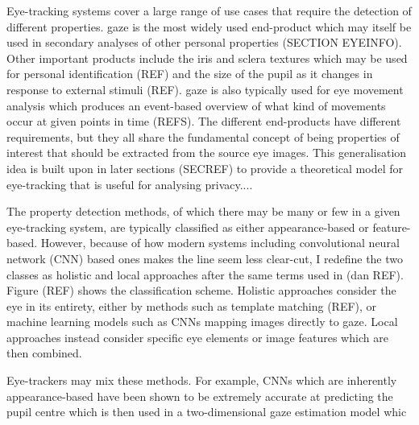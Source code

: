 Eye-tracking systems cover a large range of use cases that require the detection of different properties. \Gls{gaze} is the most widely used end-product which may itself be used in secondary analyses of other personal properties (SECTION EYEINFO). Other important products include the iris and sclera textures which may be used for personal identification (REF) and the size of the pupil as it changes in response to external stimuli (REF). \Gls{gaze} is also typically used for eye movement analysis which produces an event-based overview of what kind of movements occur at given points in time (REFS). The different end-products have different requirements, but they all share the fundamental concept of being properties of interest that should be extracted from the source eye images. This generalisation idea is built upon in later sections (SECREF) to provide a theoretical model for eye-tracking that is useful for analysing privacy.... 

The property detection methods, of which there may be many or few in a given eye-tracking system, are typically classified as either appearance-based or feature-based. However, because of how modern systems including convolutional neural network (CNN) based ones makes the line seem less clear-cut, I redefine the two classes as holistic and local approaches after the same terms used in (dan REF). Figure (REF) shows the classification scheme. Holistic approaches consider the eye in its entirety, either by methods such as template matching (REF), or machine learning models such as CNNs mapping images directly to gaze. Local approaches instead consider specific eye elements or image features which are then combined. 

Eye-trackers may mix these methods. For example, CNNs which are inherently appearance-based have been shown to be extremely accurate at predicting the pupil centre which is then used in a two-dimensional gaze estimation model whic







